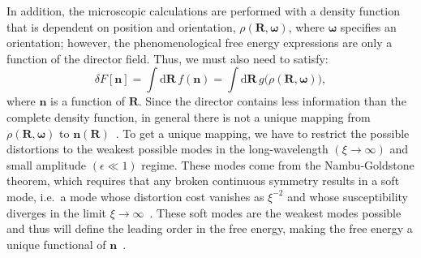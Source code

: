 In addition, the microscopic calculations are performed with a density function that is dependent on position and orientation, $\rho(\mathbf{R},\mathbf{\omega})$, where $\mathbf{\omega}$ specifies an orientation; however, the phenomenological free energy expressions are only a function of the director field.
Thus, we must also need to satisfy:
\begin{equation}
  \delta F[\mathbf{n}] = \int \textrm{d} \mathbf{R} \, f(\mathbf{n}) = \int \textrm{d} \mathbf{R} \, g \big ( \rho(\mathbf{R},\mathbf{\omega}) \big),\label{e:2-LessInfo}
\end{equation}
where $\mathbf{n}$ is a function of $\mathbf{R}$.
Since the director contains less information than the complete density function, in general there is not a unique mapping from  $\rho(\mathbf{R},\mathbf{\omega})$ to $\mathbf{n}(\mathbf{R})$~\cite{RN55}.
To get a unique mapping, we have to restrict the possible distortions to the weakest possible modes in the long-wavelength $(\xi \rightarrow \infty)$ and small amplitude $(\epsilon \ll 1)$ regime.
These modes come from the Nambu-Goldstone theorem, which requires that any broken continuous symmetry results in a soft mode, i.e.\ a mode whose distortion cost vanishes as $\xi^{-2}$ and whose susceptibility diverges in the limit $\xi \rightarrow \infty$~\cite{RN175}.
These soft modes are the weakest modes possible and thus will define the leading order in the free energy, making the free energy a unique functional of $\mathbf{n}$~\cite{RN55}. \\

